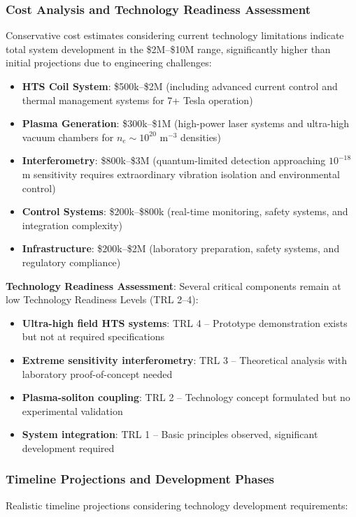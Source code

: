 \documentclass[12pt,a4paper]{article}
\begin{document}
\subsubsection{Cost Analysis and Technology Readiness Assessment}
Conservative cost estimates considering current technology limitations indicate total system development in the \$2M--\$10M range, significantly higher than initial projections due to engineering challenges:
\begin{itemize}
\item \textbf{HTS Coil System}: \$500k--\$2M (including advanced current control and thermal management systems for 7+ Tesla operation)
\item \textbf{Plasma Generation}: \$300k--\$1M (high-power laser systems and ultra-high vacuum chambers for $n_e \sim 10^{20}$ m$^{-3}$ densities)
\item \textbf{Interferometry}: \$800k--\$3M (quantum-limited detection approaching $10^{-18}$ m sensitivity requires extraordinary vibration isolation and environmental control)
\item \textbf{Control Systems}: \$200k--\$800k (real-time monitoring, safety systems, and integration complexity)
\item \textbf{Infrastructure}: \$200k--\$2M (laboratory preparation, safety systems, and regulatory compliance)
\end{itemize}

\textbf{Technology Readiness Assessment}: Several critical components remain at low Technology Readiness Levels (TRL 2--4):
\begin{itemize}
\item \textbf{Ultra-high field HTS systems}: TRL 4 -- Prototype demonstration exists but not at required specifications
\item \textbf{Extreme sensitivity interferometry}: TRL 3 -- Theoretical analysis with laboratory proof-of-concept needed
\item \textbf{Plasma-soliton coupling}: TRL 2 -- Technology concept formulated but no experimental validation
\item \textbf{System integration}: TRL 1 -- Basic principles observed, significant development required
\end{itemize}

\subsubsection{Timeline Projections and Development Phases}
Realistic timeline projections considering technology development requirements:
\end{document}

